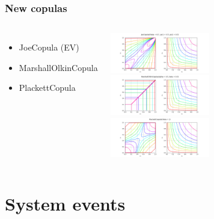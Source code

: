 \documentclass{beamer}
\begin{document}
\begin{frame}
\frametitle{New copulas}

  \begin{columns}
\begin{itemize}
\item JoeCopula (EV)
\item MarshallOlkinCopula
\item PlackettCopula
\end{itemize}
	\begin{center}
\includegraphics[width=0.5\textwidth]{figures/openturns-JoeCopula-1.png}
\includegraphics[width=0.5\textwidth]{figures/openturns-MarshallOlkinCopula-1.png}
\includegraphics[width=0.5\textwidth]{figures/openturns-PlackettCopula-1.png}
\end{center}

	\end{columns}
\end{frame}

\section{System events}

\end{document}
